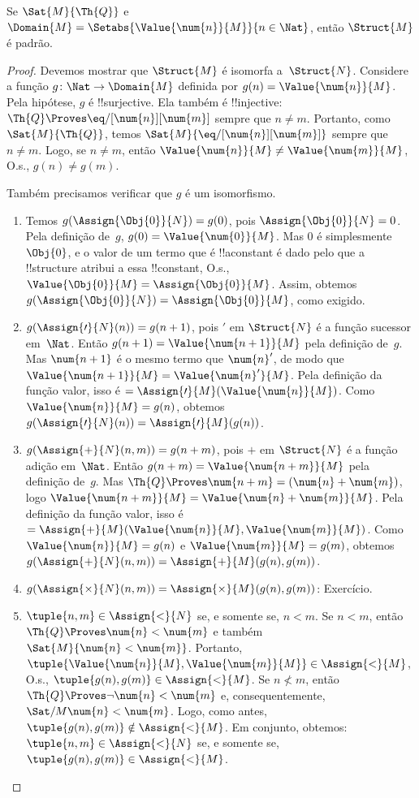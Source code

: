 \documentclass[../../../include/open-logic-section]{subfiles}
\begin{document}
\begin{prop}
Se $\Sat{M}{\Th{Q}}$ e $\Domain{M} = \Setabs{\Value{\num{n}}{M}}{n
  \in \Nat}$, então $\Struct{M}$ é padrão.
\end{prop}

\begin{proof}
Devemos mostrar que $\Struct{M}$ é isomorfa
a~$\Struct{N}$. Considere a função $g\colon \Nat \to \Domain{M}$
definida por $g(n) = \Value{\num{n}}{M}$. Pela hipótese, $g$ é
!!{surjective}. Ela também é !!{injective}: $\Th{Q} \Proves
\eq/[\num{n}][\num{m}]$ sempre que $n \neq m$. Portanto, como
$\Sat{M}{\Th{Q}}$, temos $\Sat{M}{\eq/[\num{n}][\num{m}]}$ sempre que
$n \neq m$. Logo, se $n \neq m$, então $\Value{\num{n}}{M} \neq
\Value{\num{m}}{M}$, O.s.\@, $g(n) \neq g(m)$.

Também precisamos verificar que $g$ é um isomorfismo.
\begin{enumerate}
\item Temos $g(\Assign{\Obj{0}}{N}) = g(0)$, pois
  $\Assign{\Obj{0}}{N} = 0$. Pela definição de~$g$, $g(0) =
  \Value{\num{0}}{M}$. Mas $\num{0}$ é simplesmente $\Obj{0}$, e o
  valor de um termo que é !!a{constant} é dado pelo que a !!{structure}
  atribui a essa !!{constant}, O.s.\@,
  $\Value{\Obj{0}}{M} = \Assign{\Obj{0}}{M}$. Assim, obtemos
  $g(\Assign{\Obj{0}}{N}) = \Assign{\Obj{0}}{M}$, como exigido.
\item $g(\Assign{\prime}{N}(n)) = g(n+1)$, pois $\prime$ em
  $\Struct{N}$ é a função sucessor em~$\Nat$. Então $g(n+1) =
  \Value{\num{n+1}}{M}$ pela definição de~$g$. Mas $\num{n+1}$ é o
  mesmo termo que $\num{n}'$, de modo que $\Value{\num{n+1}}{M} =
  \Value{\num{n}'}{M}$. Pela definição da função valor, isso é
  $= \Assign{\prime}{M}(\Value{\num{n}}{M})$. Como
  $\Value{\num{n}}{M} = g(n)$, obtemos $g(\Assign{\prime}{N}(n)) =
  \Assign{\prime}{M}(g(n))$.
\item $g(\Assign{+}{N}(n,m)) = g(n+m)$, pois $+$ em $\Struct{N}$ é a
  função adição em~$\Nat$. Então $g(n+m) = \Value{\num{n+m}}{M}$ pela
  definição de~$g$. Mas $\Th{Q} \Proves \num{n+m} = (\num{n} +
  \num{m})$, logo $\Value{\num{n+m}}{M} =
  \Value{\num{n}+\num{m}}{M}$. Pela definição da função valor, isso é
  $= \Assign{+}{M}(\Value{\num{n}}{M},\Value{\num{m}}{M})$. Como
  $\Value{\num{n}}{M} = g(n)$ e $\Value{\num{m}}{M} = g(m)$, obtemos
  $g(\Assign{+}{N}(n, m)) = \Assign{+}{M}(g(n), g(m))$.
\item $g(\Assign{\times}{N}(n, m)) = \Assign{\times}{M}(g(n), g(m))$:
  Exercício.
\item $\tuple{n,m} \in \Assign{<}{N}$ se, e somente se, $n < m$. Se
  $n < m$, então $\Th{Q} \Proves \num{n} < \num{m}$ e também
  $\Sat{M}{\num{n} < \num{m}}$. Portanto,
  $\tuple{\Value{\num{n}}{M}, \Value{\num{m}}{M}} \in
  \Assign{<}{M}$, O.s.\@, $\tuple{g(n), g(m)} \in \Assign{<}{M}$. Se
  $n \not< m$, então $\Th{Q} \Proves \lnot \num{n} < \num{m}$ e,
  consequentemente, $\Sat/{M}{\num{n} < \num{m}}$. Logo, como antes,
  $\tuple{g(n), g(m)} \notin \Assign{<}{M}$. Em conjunto, obtemos:
  $\tuple{n,m} \in \Assign{<}{N}$ se, e somente se,
  $\tuple{g(n), g(m)} \in \Assign{<}{M}$.
\end{enumerate}
\end{proof}
\end{document}
